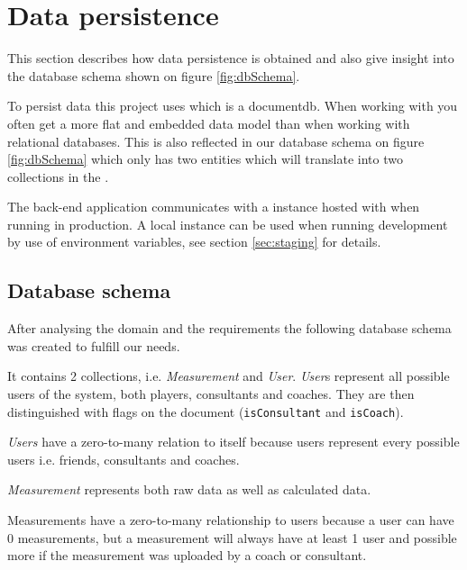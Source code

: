 \section{Data persistence}
This section describes how data persistence is obtained and also give insight into the database schema shown on figure \ref{fig:dbSchema}.

To persist data this project uses  which is a \gls{documentdb}.
When working with  you often get a more flat and embedded data model than when working with relational databases. 
This is also reflected in our database schema on figure \ref{fig:dbSchema} which only has two entities which will translate into two collections in the .

The back-end application communicates with a  instance hosted with  when running in production.
A local instance can be used when running development by use of environment variables, see section \ref{sec:staging} for details.

\subsection{Database schema}
After analysing the domain and the requirements the following database schema was created to fulfill our needs.

It contains 2 collections, i.e. \textit{Measurement} and \textit{User}. \textit{User}s represent all possible users of the system, both players, consultants and coaches. 
They are then distinguished with flags on the document (\verb+isConsultant+ and \verb+isCoach+).

\textit{Users} have a zero-to-many relation to itself because users represent every possible users i.e. friends, consultants and coaches.

\textit{Measurement} represents both raw data as well as calculated data.

Measurements have a zero-to-many relationship to users because a user can have 0 measurements, but a measurement will always have at least 1 user and possible more if the measurement was uploaded by a coach or consultant.

